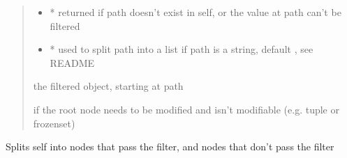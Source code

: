 \documentclass[a4paper,10pt,english]{sphinxmanual}
\begin{document}
\begin{fulllineitems}
\begin{fulllineitems}
\begin{quote}
\begin{description}
\begin{itemize}
\item {}
\sphinxAtStartPar
{} \textendash{} * returned if path doesn’t exist in self, or the value at path can’t be filtered

\item {}
\sphinxAtStartPar
{} \textendash{} * used to split path into a list if path is a string, default , see README

\end{itemize}

\sphinxAtStartPar
the filtered object, starting at path

\sphinxAtStartPar
{} \textendash{} if the root node needs to be modified and isn’t modifiable (e.g. tuple or frozenset)

\end{description}\end{quote}

\end{fulllineitems}


\begin{fulllineitems}
\label{\detokenize{fagus.fagus:fagus.fagus.Fagus.split}}
\pysigstartsignatures
{}
\pysigstopsignatures
\sphinxAtStartPar
Splits self into nodes that pass the filter, and nodes that don’t pass the filter


\end{fulllineitems}
\end{fulllineitems}
\end{document}

